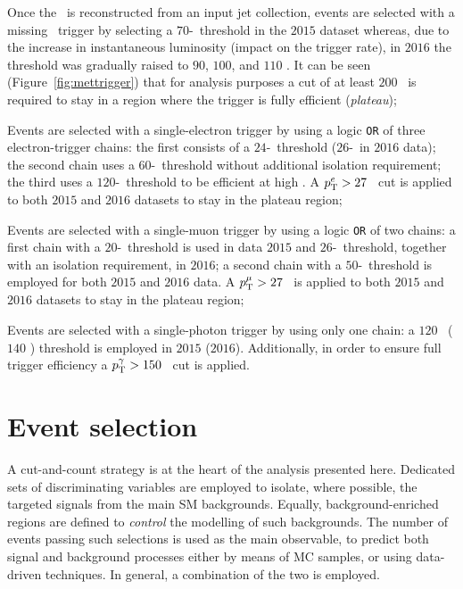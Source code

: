 			Once the \met\ is reconstructed from an input jet collection, events are selected with a missing \et\ trigger by selecting a $70$-\GeV\ threshold in the $2015$ dataset whereas, due to the increase in instantaneous luminosity (impact on the trigger rate), in $2016$ the threshold was gradually raised to $90$, $100$, and $110$ \GeV. It can be seen (Figure~\ref{fig:mettrigger}) that for analysis purposes a cut of at least $200$ \GeV\ is required to stay in a region where the trigger is fully efficient (\emph{plateau}); 

			Events are selected with a single-electron trigger by using a logic \texttt{OR} of three electron-trigger chains: the first consists of a $24$-\GeV\ threshold ($26$-\GeV\ in $2016$ data); the second chain uses a $60$-\GeV\ threshold without additional isolation requirement; the third uses a $120$-\GeV\ threshold to be efficient at high \et. A $p_{\mathrm{T}}^e > 27$ \GeV\ cut is applied to both $2015$ and $2016$ datasets to stay in the plateau region;

			Events are selected with a single-muon trigger by using a logic \texttt{OR} of two chains: a first chain with a $20$-\GeV\ threshold is used in data $2015$ and $26$-\GeV\ threshold, together with an isolation requirement, in $2016$; a second chain with a $50$-\GeV\ threshold is employed for both $2015$ and $2016$ data. A $p_{\mathrm{T}}^\mu > 27$ \GeV\ is applied to both $2015$ and $2016$ datasets to stay in the plateau region;

			Events are selected with a single-photon trigger by using only one chain: a $120$ \GeV\ ($140$ \GeV) threshold is employed in $2015$ ($2016$). Additionally, in order to ensure full trigger efficiency a $p_{\mathrm{T}}^\gamma > 150$ \GeV\ cut is applied.


	\section{Event selection}
	\label{sec:evtsel}

		A cut-and-count strategy is at the heart of the analysis presented here. Dedicated sets of discriminating variables are employed to isolate, where possible, the targeted signals from the main \ac{SM} backgrounds. Equally, background-enriched regions are defined to \emph{control} the modelling of such backgrounds. The number of events passing such selections is used as the main observable, to predict both signal and background processes either by means of \ac{MC} samples, or using data-driven techniques. In general, a combination of the two is employed. 

